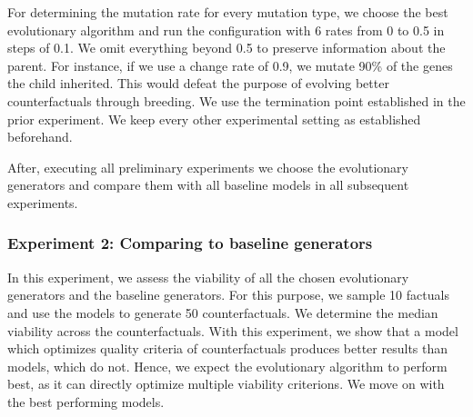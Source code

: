 \documentclass[./../../paper.tex]{subfiles}
\begin{document}

For determining the mutation rate for every mutation type, we choose the best evolutionary algorithm and run the configuration with 6 rates from 0 to 0.5 in steps of 0.1. We omit everything beyond 0.5 to preserve information about the parent. For instance, if we use a change rate of 0.9, we mutate 90\% of the genes the child inherited. This would defeat the purpose of evolving better counterfactuals through breeding. We use the termination point established in the prior experiment. We keep every other experimental setting as established beforehand. 

After, executing all preliminary experiments we choose the evolutionary generators and compare them with all baseline models in all subsequent experiments.






\subsubsection{Experiment 2: Comparing to baseline generators}
In this experiment, we assess the viability of all the chosen evolutionary generators and the baseline generators. For this purpose, we sample 10 factuals and use the models to generate 50 counterfactuals. We determine the median viability across the counterfactuals. With this experiment, we show that a model which optimizes quality criteria of counterfactuals produces better results than models, which do not. Hence, we expect the evolutionary algorithm to perform best, as it can directly optimize multiple viability criterions. We move on with the best performing models.


\end{document}
